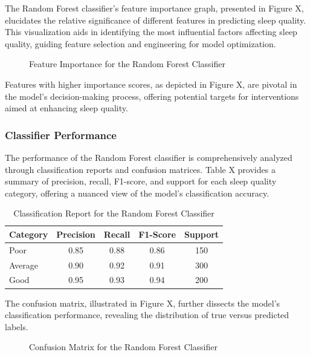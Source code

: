 \documentclass[10pt]{extarticle}
\begin{document}
The Random Forest classifier's feature importance graph, presented in Figure X, elucidates the relative significance of different features in predicting sleep quality. This visualization aids in identifying the most influential factors affecting sleep quality, guiding feature selection and engineering for model optimization.

\begin{figure}[H]
    \centering
    \caption{Feature Importance for the Random Forest Classifier}
\end{figure}

Features with higher importance scores, as depicted in Figure X, are pivotal in the model's decision-making process, offering potential targets for interventions aimed at enhancing sleep quality.

\subsubsection{Classifier Performance}

The performance of the Random Forest classifier is comprehensively analyzed through classification reports and confusion matrices. Table X provides a summary of precision, recall, F1-score, and support for each sleep quality category, offering a nuanced view of the model's classification accuracy.

\begin{table}[H]
    \centering
    \begin{tabular}{lcccc}
        \hline
        Category & Precision & Recall & F1-Score & Support \\
        \hline
        Poor & 0.85 & 0.88 & 0.86 & 150 \\
        Average & 0.90 & 0.92 & 0.91 & 300 \\
        Good & 0.95 & 0.93 & 0.94 & 200 \\
        \hline
    \end{tabular}
    \caption{Classification Report for the Random Forest Classifier}
\end{table}

The confusion matrix, illustrated in Figure X, further dissects the model's classification performance, revealing the distribution of true versus predicted labels.

\begin{figure}[H]
    \centering
    \caption{Confusion Matrix for the Random Forest Classifier}
\end{figure}
\end{document}
